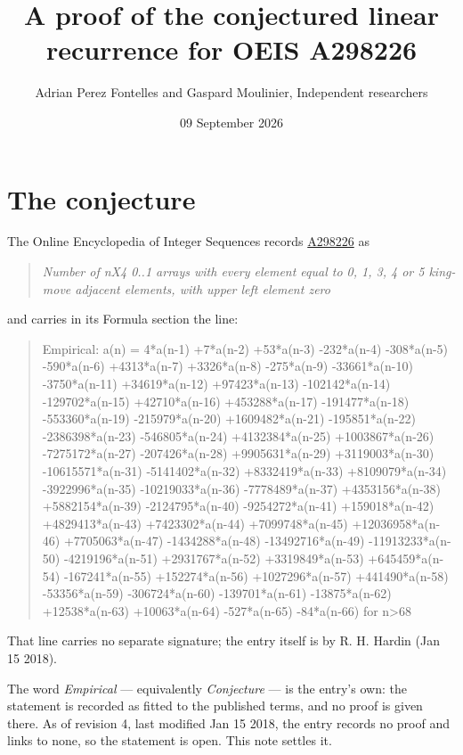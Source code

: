 \documentclass[11pt]{article}
\title{A proof of the conjectured linear recurrence for OEIS A298226}
\author{Adrian Perez Fontelles and Gaspard Moulinier, Independent researchers}
\date{09 September 2026}
\theoremstyle{definition}
\begin{document}
\maketitle
\section{The conjecture}

The Online Encyclopedia of Integer Sequences records \href{https://oeis.org/A298226}{A298226} as

\begin{quote}\itshape Number of nX4 0..1 arrays with every element equal to 0, 1, 3, 4 or 5 king-move adjacent elements, with upper left element zero\end{quote}

and carries in its Formula section the line:

\begin{quote}\ttfamily Empirical: a(n) = 4*a(n-1) +7*a(n-2) +53*a(n-3) -232*a(n-4) -308*a(n-5) -590*a(n-6) +4313*a(n-7) +3326*a(n-8) -275*a(n-9) -33661*a(n-10) -3750*a(n-11) +34619*a(n-12) +97423*a(n-13) -102142*a(n-14) -129702*a(n-15) +42710*a(n-16) +453288*a(n-17) -191477*a(n-18) -553360*a(n-19) -215979*a(n-20) +1609482*a(n-21) -195851*a(n-22) -2386398*a(n-23) -546805*a(n-24) +4132384*a(n-25) +1003867*a(n-26) -7275172*a(n-27) -207426*a(n-28) +9905631*a(n-29) +3119003*a(n-30) -10615571*a(n-31) -5141402*a(n-32) +8332419*a(n-33) +8109079*a(n-34) -3922996*a(n-35) -10219033*a(n-36) -7778489*a(n-37) +4353156*a(n-38) +5882154*a(n-39) -2124795*a(n-40) -9254272*a(n-41) +159018*a(n-42) +4829413*a(n-43) +7423302*a(n-44) +7099748*a(n-45) +12036958*a(n-46) +7705063*a(n-47) -1434288*a(n-48) -13492716*a(n-49) -11913233*a(n-50) -4219196*a(n-51) +2931767*a(n-52) +3319849*a(n-53) +645459*a(n-54) -167241*a(n-55) +152274*a(n-56) +1027296*a(n-57) +441490*a(n-58) -53356*a(n-59) -306724*a(n-60) -139701*a(n-61) -13875*a(n-62) +12538*a(n-63) +10063*a(n-64) -527*a(n-65) -84*a(n-66) for n>68\end{quote}

That line carries no separate signature; the entry itself is by R. H. Hardin (Jan 15 2018).

The word {\itshape Empirical} --- equivalently {\itshape Conjecture} --- is the entry's own: the statement is recorded as fitted to the published terms, and no proof is given there. As of revision 4, last modified Jan 15 2018, the entry records no proof and links to none, so the statement is open. This note settles it.
\end{document}
